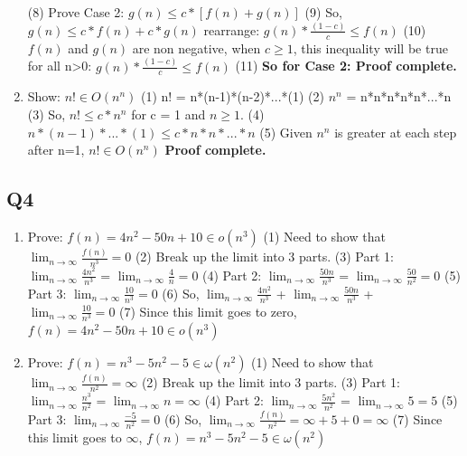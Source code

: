 \documentclass{article}
\begin{document}
\begin{enumerate}[label=(\alph*)]
    \subitem (8) Prove Case 2: $g(n) \leq c * [f(n)+g(n)]$
    \subitem (9) So, $g(n) \leq c*f(n)+c*g(n)$ rearrange: $g(n) * \frac{(1-c)}{c} \leq f(n)$
    \subitem (10) $f(n)$ and $g(n)$ are non negative, when $c \geq 1$, this inequality will be true for all n>0: $g(n) * \frac{(1-c)}{c} \leq f(n)$
    \subitem (11) \textbf{So for Case 2: Proof complete.} 

    \item Show: $n! \in O(n^n)$
    \subitem (1) n! = n*(n-1)*(n-2)*...*(1)
    \subitem (2) $n^n$ = n*n*n*n*n*...*n
    \subitem (3) So, $n! \leq c * n^n$ for c = 1 and $n \geq 1$.
    \subitem (4) $n*(n-1)*...*(1) \leq c * n*n*...*n$
    \subitem (5) Given $n^n$ is greater at each step after n=1, $n! \in O(n^n)$
    \textbf{Proof complete.} 


\end{enumerate}

\subsection*{Q4}
\begin{enumerate}[label=(\alph*)]
    \item Prove: $f(n) = 4n^2 - 50n + 10 \in o(n^3)$
    \subitem (1) Need to show that $\lim_{n\to\infty} \frac{f(n)}{n^3} = 0$
    \subitem (2) Break up the limit into 3 parts.
    \subitem (3) Part 1: $\lim_{n\to\infty} \frac{4n^2}{n^3}$ = $\lim_{n\to\infty} \frac{4}{n} = 0$
    \subitem (4) Part 2: $\lim_{n\to\infty} \frac{50n}{n^3}$ = $\lim_{n\to\infty} \frac{50}{n^2} = 0$
    \subitem (5) Part 3: $\lim_{n\to\infty} \frac{10}{n^3} = 0$
    \subitem (6) So, $\lim_{n\to\infty} \frac{4n^2}{n^3}$ + $\lim_{n\to\infty} \frac{50n}{n^3}$ + $\lim_{n\to\infty} \frac{10}{n^3} = 0$
    \subitem (7) Since this limit goes to zero, $f(n) = 4n^2 - 50n + 10 \in o(n^3)$

    \item Prove: $f(n) = n^3 - 5n^2 - 5 \in \omega(n^2)$
    \subitem (1) Need to show that $\lim_{n\to\infty} \frac{f(n)}{n^2} = \infty$
    \subitem (2) Break up the limit into 3 parts.
    \subitem (3) Part 1: $\lim_{n\to\infty} \frac{n^3}{n^2}$ = $\lim_{n\to\infty} n = \infty$
    \subitem (4) Part 2: $\lim_{n\to\infty} \frac{5n^2}{n^2}$ = $\lim_{n\to\infty} 5 = 5$
    \subitem (5) Part 3: $\lim_{n\to\infty} \frac{-5}{n^2} = 0$
    \subitem (6) So, $\lim_{n\to\infty} \frac{f(n)}{n^2} = \infty + 5 + 0 = \infty$
    \subitem (7) Since this limit goes to $\infty$, $f(n) = n^3 - 5n^2 - 5 \in \omega(n^2)$

\end{enumerate}
\end{document}
